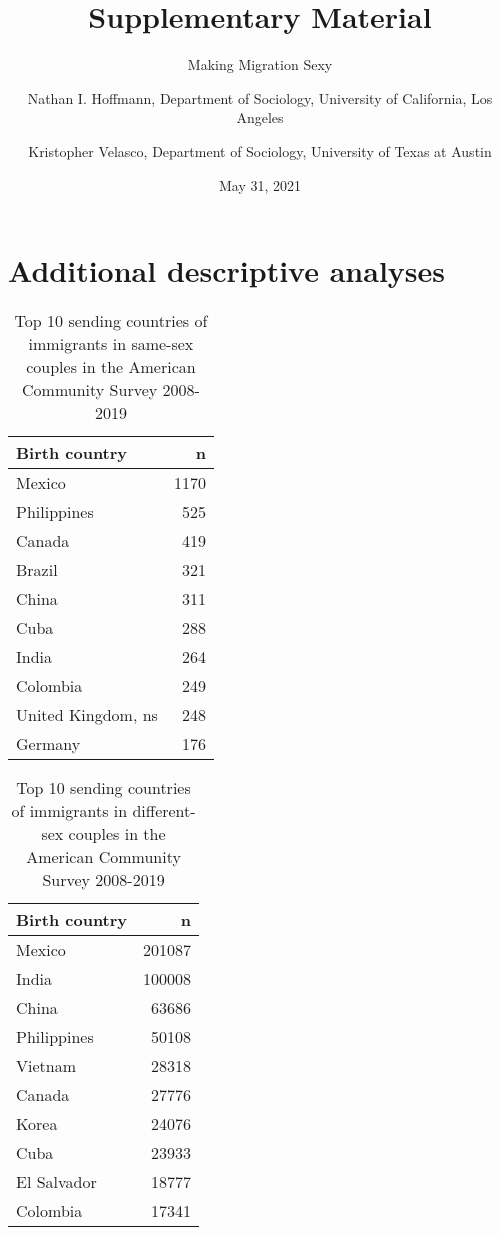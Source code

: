 \documentclass[
  11pt,
]{article}
\title{Supplementary Material}
\subtitle{Making Migration Sexy}
\author{Nathan I. Hoffmann, Department of Sociology, University of California, Los Angeles \and Kristopher Velasco, Department of Sociology, University of Texas at Austin}
\date{May 31, 2021}
\begin{document}
\maketitle

{
\hypersetup{linkcolor=}
\setcounter{tocdepth}{2}
\tableofcontents
}
\hypertarget{additional-descriptive-analyses}{%
\section{Additional descriptive analyses}\label{additional-descriptive-analyses}}

\begin{table}

\caption{\label{tab:desc-top1}Top 10 sending countries of immigrants in same-sex couples in the American Community Survey 2008-2019}
\centering
\begin{tabular}[t]{lr}
\toprule
Birth country & n\\
\midrule
Mexico & 1170\\
Philippines & 525\\
Canada & 419\\
Brazil & 321\\
China & 311\\
\addlinespace
Cuba & 288\\
India & 264\\
Colombia & 249\\
United Kingdom, ns & 248\\
Germany & 176\\
\bottomrule
\end{tabular}
\end{table}

\begin{table}

\caption{\label{tab:desc-top2}Top 10 sending countries of immigrants in different-sex couples in the American Community Survey 2008-2019}
\centering
\begin{tabular}[t]{lr}
\toprule
Birth country & n\\
\midrule
Mexico & 201087\\
India & 100008\\
China & 63686\\
Philippines & 50108\\
Vietnam & 28318\\
\addlinespace
Canada & 27776\\
Korea & 24076\\
Cuba & 23933\\
El Salvador & 18777\\
Colombia & 17341\\
\bottomrule
\end{tabular}
\end{table}
\end{document}
